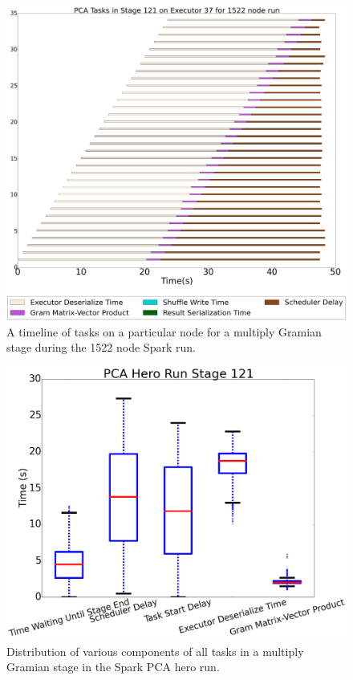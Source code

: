 \begin{figure}[t]
\centering
\includegraphics[width=\textwidth]{fig/spark_pca_hero_timeline.png}
\caption{A timeline of tasks on a particular node for a multiply Gramian stage during the 1522 node Spark run. }
\label{fig:hero-timeline}
\end{figure}

\begin{figure}[t]
\centering
\includegraphics[width=\textwidth]{fig/pca_box_and_whiskers.png}
\caption{Distribution of various components of all tasks in a multiply Gramian stage in the Spark PCA hero run. }
\label{fig:whisker}
\end{figure}
